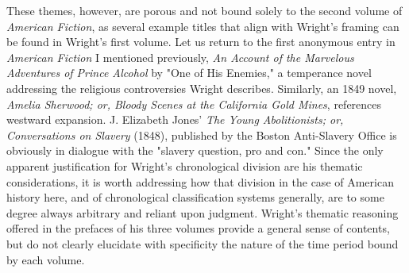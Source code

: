 These themes, however, are porous and not bound solely to the second volume of \textit{American Fiction}, as several example titles that align with Wright's framing can be found in Wright's first volume. Let us return to the first anonymous entry in \textit{American Fiction} I mentioned previously, \textit{An Account of the Marvelous Adventures of Prince Alcohol} by "One of His Enemies," a temperance novel addressing the religious controversies Wright describes.\autocite[1]{wright_american_1939} Similarly, an 1849 novel, \textit{Amelia Sherwood; or, Bloody Scenes at the California Gold Mines}, references westward expansion.\autocite[5]{wright_american_1939} J. Elizabeth Jones' \textit{The Young Abolitionists; or, Conversations on Slavery} (1848), published by the Boston Anti-Slavery Office is obviously in dialogue with the "slavery question, pro and con."\autocite[156]{wright_american_1939} Since the only apparent justification for Wright's chronological division are his thematic considerations, it is worth addressing how that division in the case of American history here, and of chronological classification systems generally, are to some degree always arbitrary and reliant upon judgment. Wright's thematic reasoning offered in the prefaces of his three volumes provide a general sense of contents, but do not clearly elucidate with specificity the nature of the time period bound by each volume.  

